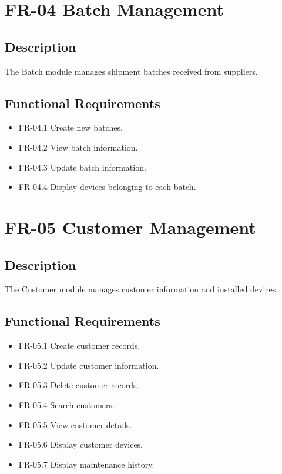 \section{FR-04 Batch Management}

\subsection*{Description}

The Batch module manages shipment batches received from suppliers.

\subsection*{Functional Requirements}

\begin{itemize}
    \item FR-04.1 Create new batches.
    \item FR-04.2 View batch information.
    \item FR-04.3 Update batch information.
    \item FR-04.4 Display devices belonging to each batch.
\end{itemize}

\section{FR-05 Customer Management}

\subsection*{Description}

The Customer module manages customer information and installed devices.

\subsection*{Functional Requirements}

\begin{itemize}
    \item FR-05.1 Create customer records.
    \item FR-05.2 Update customer information.
    \item FR-05.3 Delete customer records.
    \item FR-05.4 Search customers.
    \item FR-05.5 View customer details.
    \item FR-05.6 Display customer devices.
    \item FR-05.7 Display maintenance history.
\end{itemize}

